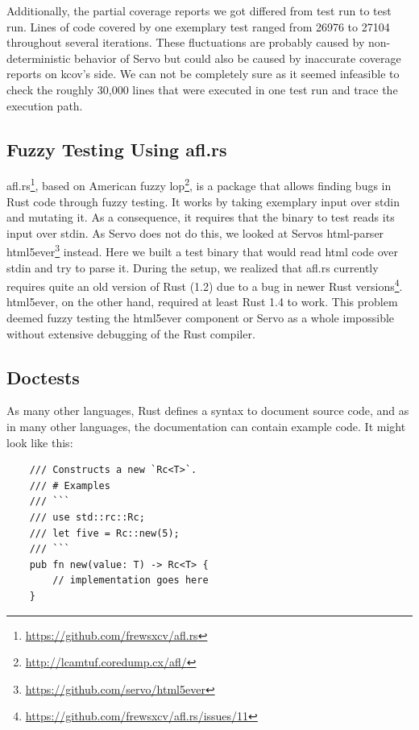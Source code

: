 \documentclass{scrartcl}
\begin{document}
Additionally, the partial coverage reports we got differed from test run to test run. Lines of code covered by one exemplary test ranged from 26976 to 27104 throughout several iterations. These fluctuations are probably caused by non-deterministic behavior of Servo but could also be caused by inaccurate coverage reports on kcov's side. We can not be completely sure as it seemed infeasible to check the roughly 30,000 lines that were executed in one test run and trace the execution path.


\subsection{Fuzzy Testing Using afl.rs}

afl.rs\footnote{\url{https://github.com/frewsxcv/afl.rs}}, based on American fuzzy lop\footnote{\url{http://lcamtuf.coredump.cx/afl/}}, is a package that allows finding bugs in Rust code through fuzzy testing. It works by taking exemplary input over stdin and mutating it. As a consequence, it requires that the binary to test reads its input over stdin. As Servo does not do this, we looked at Servos html-parser html5ever\footnote{\url{https://github.com/servo/html5ever}} instead. Here we built a test binary that would read html code over stdin and try to parse it. During the setup, we realized that afl.rs currently requires quite an old version of Rust (1.2) due to a bug in newer Rust versions\footnote{\url{https://github.com/frewsxcv/afl.rs/issues/11}}. html5ever, on the other hand, required at least Rust 1.4 to work. This problem deemed fuzzy testing the html5ever component or Servo as a whole impossible without extensive debugging of the Rust compiler.


\subsection{Doctests}

As many other languages, Rust defines a syntax to document source code, and as in many other languages, the documentation can contain example code. It might look like this:

\small {
    \begin{verbatim}
    /// Constructs a new `Rc<T>`.
    /// # Examples
    /// ```
    /// use std::rc::Rc;
    /// let five = Rc::new(5);
    /// ```
    pub fn new(value: T) -> Rc<T> {
        // implementation goes here
    }
    \end{verbatim}
}
\end{document}
